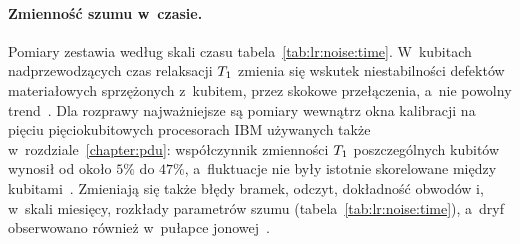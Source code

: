 \paragraph{Zmienność szumu w~czasie.}
Pomiary zestawia według skali czasu tabela~\ref{tab:lr:noise:time}.
W~kubitach nadprzewodzących czas relaksacji $T_1$ zmienia się wskutek niestabilności defektów materiałowych sprzężonych z~kubitem, przez skokowe przełączenia, a~nie powolny trend~\cite{klimov_fluctuations_2018,burnett_decoherence_2019,carroll_dynamics_2022}.
Dla rozprawy najważniejsze są pomiary wewnątrz okna kalibracji na pięciu pięciokubitowych procesorach IBM używanych także w~rozdziale~\ref{chapter:pdu}: współczynnik zmienności $T_1$ poszczególnych kubitów wynosił od około $5\%$ do $47\%$, a~fluktuacje nie były istotnie skorelowane między kubitami~\cite{etxezarreta_multiqubit_2023}.
Zmieniają się także błędy bramek, odczyt, dokładność obwodów i, w~skali miesięcy, rozkłady parametrów szumu (tabela~\ref{tab:lr:noise:time}), a~dryf obserwowano również w~pułapce jonowej~\cite{proctor_detecting_2020}.

